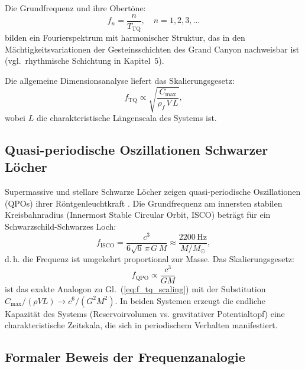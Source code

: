 ﻿\documentclass[12pt,a4paper]{report}
\begin{document}
Die Grundfrequenz und ihre Obertöne:
\begin{equation}
	f_n = \frac{n}{T_{\mathrm{TQ}}}, \quad n = 1, 2, 3, \ldots
	\label{eq:frequenzen_tq}
\end{equation}
bilden ein Fourierspektrum mit harmonischer Struktur, das in den Mächtigkeitsvariationen der Gesteinsschichten des Grand Canyon nachweisbar ist (vgl.\ rhythmische Schichtung in Kapitel~5).

Die allgemeine Dimensionsanalyse liefert das Skalierungsgesetz:
\begin{equation}
	f_{\mathrm{TQ}} \propto \sqrt{\frac{C_{\max}}{\rho_f\, V\, L}},
	\label{eq:f_tq_scaling}
\end{equation}
wobei $L$ die charakteristische Längenscala des Systems ist.

\subsection{Quasi-periodische Oszillationen Schwarzer Löcher}

Supermassive und stellare Schwarze Löcher zeigen quasi-periodische Oszillationen (QPOs) ihrer Röntgenleuchtkraft \cite{strohmayer2001}. Die Grundfrequenz am innersten stabilen Kreisbahnradius (Innermost Stable Circular Orbit, ISCO) beträgt für ein Schwarzschild-Schwarzes Loch:
\begin{equation}
	f_{\mathrm{ISCO}} = \frac{c^3}{6\sqrt{6}\,\pi\,G\,M} \approx \frac{2200\,\mathrm{Hz}}{M/M_\odot},
	\label{eq:f_isco}
\end{equation}
d.\,h. die Frequenz ist umgekehrt proportional zur Masse. Das Skalierungsgesetz:
\begin{equation}
	f_{\mathrm{QPO}} \propto \frac{c^3}{GM}
	\label{eq:f_qpo_scaling}
\end{equation}
ist das exakte Analogon zu Gl.~(\ref{eq:f_tq_scaling}) mit der Substitution $C_{\max}/(\rho V L) \to c^6/(G^2 M^2)$. In beiden Systemen erzeugt die endliche Kapazität des Systems (Reservoirvolumen vs. gravitativer Potentialtopf) eine charakteristische Zeitskala, die sich in periodischem Verhalten manifestiert.

\subsection{Formaler Beweis der Frequenzanalogie}
\end{document}
